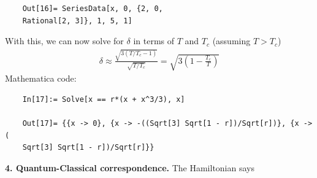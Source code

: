 \documentclass{article}
\theoremstyle{definition}
\newcommand{\f}[2]{\frac{#1}{#2}}
\newcommand{\lp}{\left(}
\newcommand{\rp}{\right)}
\begin{document}
\begin{enumerate}[label=(\alph*)]
\begin{lstlisting}
	Out[16]= SeriesData[x, 0, {2, 0, 
	Rational[2, 3]}, 1, 5, 1]
	\end{lstlisting}
	
	With this, we can now solve for $\delta$ in terms of $T$ and $T_c$ (assuming $T>T_c$)
	\begin{align*}
	\boxed{\delta \approx \f{\sqrt{3(T/T_c-1)}}{\sqrt{T/T_c}} = \sqrt{3\lp 1 - \f{T_c}{T} \rp}}
	\end{align*}
	Mathematica code:
	\begin{lstlisting}
	In[17]:= Solve[x == r*(x + x^3/3), x]
	
	Out[17]= {{x -> 0}, {x -> -((Sqrt[3] Sqrt[1 - r])/Sqrt[r])}, {x -> (
	Sqrt[3] Sqrt[1 - r])/Sqrt[r]}}
	\end{lstlisting}
\end{enumerate}

\noindent \textbf{4. Quantum-Classical correspondence.} The Hamiltonian says 
\end{document}
